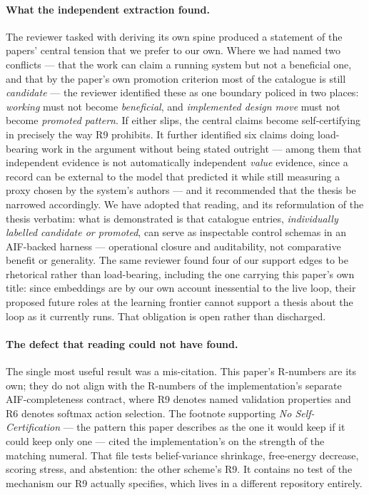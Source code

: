 \paragraph{What the independent extraction found.}  The reviewer tasked with
deriving its own spine produced a statement of the papers' central tension that
we prefer to our own.  Where we had named two conflicts --- that the work can
claim a running system but not a beneficial one, and that by the paper's own
promotion criterion most of the catalogue is still \emph{candidate} --- the
reviewer identified these as one boundary policed in two places: \emph{working}
must not become \emph{beneficial}, and \emph{implemented design move} must not
become \emph{promoted pattern}.  If either slips, the central claims become
self-certifying in precisely the way R9 prohibits.  It further identified six
claims doing load-bearing work in the argument without being stated outright ---
among them that independent evidence is not automatically independent
\emph{value} evidence, since a record can be external to the model that predicted
it while still measuring a proxy chosen by the system's authors --- and it
recommended that the thesis be narrowed accordingly.  We have adopted that
reading, and its reformulation of the thesis verbatim: what is demonstrated is
that catalogue entries, \emph{individually labelled candidate or promoted}, can
serve as inspectable control schemas in an AIF-backed harness --- operational
closure and auditability, not comparative benefit or generality.  The same
reviewer found four of our support edges to be rhetorical rather than load-bearing,
including the one carrying this paper's own title: since embeddings are by our own
account inessential to the live loop, their proposed future roles at the learning
frontier cannot support a thesis about the loop as it currently runs.  That
obligation is open rather than discharged.

\paragraph{The defect that reading could not have found.}  The single most
useful result was a mis-citation.  This paper's R-numbers are its own; they do
not align with the R-numbers of the implementation's separate AIF-completeness
contract, where R9 denotes named validation properties and R6 denotes softmax
action selection.  The footnote supporting \emph{No Self-Certification} --- the
pattern this paper describes as the one it would keep if it could keep only one
--- cited the implementation's  on the
strength of the matching numeral.  That file tests belief-variance shrinkage,
free-energy decrease, scoring stress, and abstention: the other scheme's R9.  It
contains no test of the mechanism our R9 actually specifies, which lives in a
different repository entirely.

